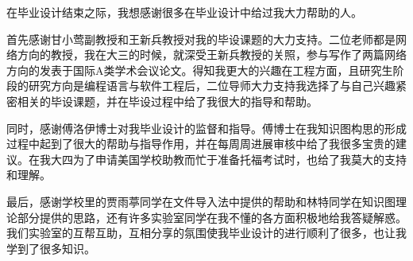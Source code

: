 \begin{thanks}

  在毕业设计结束之际，我想感谢很多在毕业设计中给过我大力帮助的人。

  首先感谢甘小莺副教授和王新兵教授对我的毕设课题的大力支持。二位老师都是网络方向的教授，我在大三的时候，就深受王新兵教授的关照，参与写作了两篇网络方向的发表于国际A类学术会议论文。得知我更大的兴趣在工程方面，且研究生阶段的研究方向是编程语言与软件工程后，二位导师大力支持我选择了与自己兴趣紧密相关的毕设课题，并在毕设过程中给了我很大的指导和帮助。

  同时，感谢傅洛伊博士对我毕业设计的监督和指导。傅博士在我知识图构思的形成过程中起到了很大的帮助与指导作用，并在每周周进展审核中给了我很多宝贵的建议。在我大四为了申请美国学校助教而忙于准备托福考试时，也给了我莫大的支持和理解。

  最后，感谢学校里的贾雨葶同学在文件导入法中提供的帮助和林特同学在知识图理论部分提供的思路，还有许多实验室同学在我不懂的各方面积极地给我答疑解惑。我们实验室的互帮互助，互相分享的氛围使我毕业设计的进行顺利了很多，也让我学到了很多知识。

\end{thanks}

